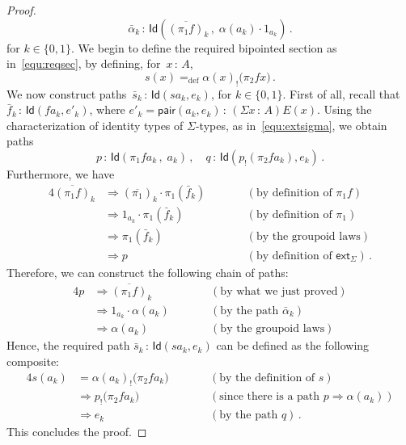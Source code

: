 \documentclass[10pt,a4paper,oneside,reqno]{amsart}
\numberwithin{equation}{section}
\theoremstyle{mythm}
\theoremstyle{mydef}
\theoremstyle{myrmk}
\newcommand{\deq}{=}
\newcommand{\defeq}{=_{\mathrm{def}}}
\newcommand{\co}{\,{:}\,}
\newcommand{\ct}{\cdot}
\newcommand{\ext}{\mathsf{ext}}
\newcommand{\Id}{\mathsf{Id}}
\newcommand{\pair}{\mathsf{pair}}
\begin{document}
\begin{proof}
\begin{equation*}
\bar{\alpha}_k \co  \Id( \overline{(\pi_1 f)}_k \, , \;  \alpha(a_k) \cdot 1_{a_k} ) \, . 
\end{equation*}
for $k \in \{ 0, 1 \}$. We begin to define the required bipointed section as in~\eqref{equ:reqsec}, by defining, for~$x \co A$, 
\begin{equation}
\label{equ:defreqsection}
s(x) \defeq \alpha(x)_{!} \big( \pi_2 f  x \big) \, .
\end{equation}
We now construct  paths~$\bar{s}_k \co \Id(s a_k, e_k)$, for $k \in \{ 0, 1 \}$. First of all, recall that 
$\bar{f}_k \co \Id( f a_k, e'_k)$, where $e'_k = \pair(a_k, e_k) \co (\Sigma x \co A) E(x)$. Using the 
characterization of identity types of $\Sigma$-types, as in~\eqref{equ:extsigma}, we obtain paths 
\begin{equation*}
\label{equ:usefulpath}
p \co  \Id( \pi_1 f  a_k \, ,\;   a_k )  \, , \quad q \co   \Id( p_{!}( \pi_2 f  a_k), e_k)   \, .
\end{equation*}
Furthermore, we have 
\begin{alignat*}{4}  
\overline{(\pi_1 f)}_k  & \Rightarrow  (\overline{\pi_1})_k \ct \pi_1(\bar{f}_k)  & & \qquad (\text{by definition of } \pi_1 f)   \\
& \Rightarrow  1_{a_k}  \ct \pi_1(\bar{f}_k)  & & \qquad (\text{by definition of } \pi_1)  \\
 & \Rightarrow \pi_1(\bar{f}_k) & & \qquad (\text{by the groupoid laws}) \\
 & \Rightarrow p  & & \qquad (\text{by definition of } \ext_\Sigma) \,  .
\end{alignat*}
Therefore, we can construct the following chain of paths:
\begin{alignat*}{4}
p & \Rightarrow  \overline{(\pi_1 f)}_k & &  \qquad (\text{by what we just proved})  \\
  & \Rightarrow 1_{a_k} \ct  \alpha(a_k)  & &  \qquad (\text{by the path } \bar{\alpha}_k ) \\ 
  & \Rightarrow  \alpha(a_k)  & & \qquad (\text{by the groupoid laws})
\end{alignat*} 
Hence,  the required path $\bar{s}_k \co  \Id(s a_k,  e_k)$ can be defined as the following composite:
\begin{alignat*}{4}
s(a_k) & \deq \alpha(a_k)_{!} \big( \pi_2 f a_k   \big) & & \qquad (\text{by the definition of } s) \\
 &              \Rightarrow   p_{!} \big( \pi_2 f a_k   \big) & & \qquad (\text{since there is a path } p \Rightarrow \alpha(a_k)) \\
   &            \Rightarrow  e_k  & &  \qquad (\text{by the path } q)  \, .
   \end{alignat*} 
   This concludes the proof.
\end{proof}
\end{document}
